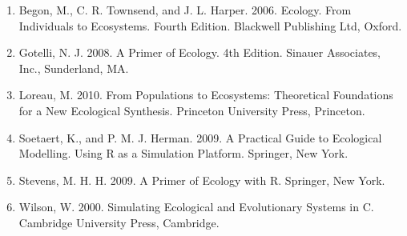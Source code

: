 \documentclass[11]{article}
\begin{document}
	\begin{enumerate} 
		\item Begon, M., C. R. Townsend, and J. L. Harper. 2006. Ecology. From Individuals to Ecosystems. Fourth Edition. Blackwell Publishing Ltd, Oxford.

\item Gotelli, N. J. 2008. A Primer of Ecology. 4th Edition. Sinauer Associates, Inc., Sunderland, MA.

\item Loreau, M. 2010. From Populations to Ecosystems: Theoretical Foundations for a New Ecological Synthesis. Princeton University Press, Princeton.

\item Soetaert, K., and P. M. J. Herman. 2009. A Practical Guide to Ecological Modelling. Using R as a Simulation Platform. Springer, New York.

\item Stevens, M. H. H. 2009. A Primer of Ecology with R. Springer, New York.

\item Wilson, W. 2000. Simulating Ecological and Evolutionary Systems in C. Cambridge University Press, Cambridge.

	\end{enumerate}
\end{document}
